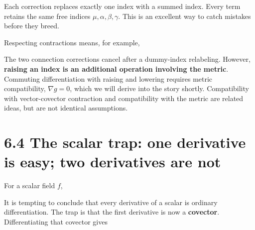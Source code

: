 \documentclass[
  11pt,
  letterpaper,
  oneside,
  openany]{scrbook}
\begin{document}
Each correction replaces exactly one index with a summed index. Every
term retains the same free indices \(\mu,\alpha,\beta,\gamma\). This is
an excellent way to catch mistakes before they breed.

Respecting contractions means, for example,

\begin{center}
\begingroup
{}
\ifdim\wd\grmathbox>\linewidth
\resizebox{\linewidth}{!}{\usebox{\grmathbox}}
\else\usebox{\grmathbox}\fi
\endgroup
\end{center}

The two connection corrections cancel after a dummy-index relabeling.
However, \textbf{raising an index is an additional operation involving
the metric}. Commuting differentiation with raising and lowering
requires metric compatibility, \(\nabla g=0\), which we will derive into
the story shortly. Compatibility with vector-covector contraction and
compatibility with the metric are related ideas, but are not identical
assumptions.

\hypertarget{the-scalar-trap-one-derivative-is-easy-two-derivatives-are-not}{%
\section{6.4 The scalar trap: one derivative is easy; two derivatives
are
not}\label{the-scalar-trap-one-derivative-is-easy-two-derivatives-are-not}}

For a scalar field \(f\),

\begin{center}
\begingroup
{}
\ifdim\wd\grmathbox>\linewidth
\resizebox{\linewidth}{!}{\usebox{\grmathbox}}
\else\usebox{\grmathbox}\fi
\endgroup
\end{center}

It is tempting to conclude that every derivative of a scalar is ordinary
differentiation. The trap is that the first derivative is now a
\textbf{covector}. Differentiating that covector gives

\begin{center}
\begingroup
{}
\ifdim\wd\grmathbox>\linewidth
\resizebox{\linewidth}{!}{\usebox{\grmathbox}}
\else\usebox{\grmathbox}\fi
\endgroup
\end{center}
\end{document}

